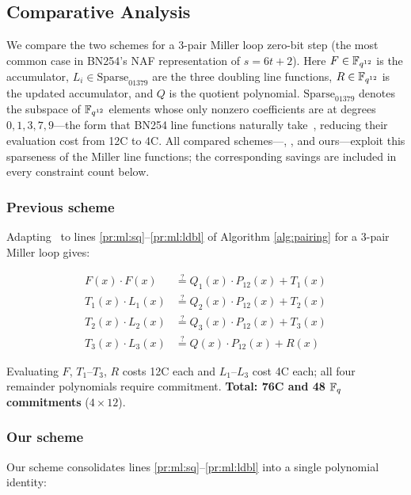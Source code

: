 \subsection{Comparative Analysis~\label{sec:ops:comp-analysis}}

We compare the two schemes for a 3-pair Miller loop zero-bit step (the most common case in BN254's NAF\cite{naf} representation of $s = 6t+2$). Here $F \in \mathbb{F}_{q^{12}}$ is the accumulator, $L_i \in \text{Sparse}_{01379}$ are the three doubling line functions, $R \in \mathbb{F}_{q^{12}}$ is the updated accumulator, and $Q$ is the quotient polynomial. $\text{Sparse}_{01379}$ denotes the subspace of $\mathbb{F}_{q^{12}}$ elements whose only nonzero coefficients are at degrees $0,1,3,7,9$---the form that BN254 line functions naturally take~\cite{PR1CS22}, reducing their evaluation cost from 12C to 4C. All compared schemes---\cite{PR1CS22}, \cite{FXFM23}, and ours---exploit this sparseness of the Miller line functions; the corresponding savings are included in every constraint count below.

\subsubsection{Previous scheme}

Adapting~\cite{FXFM23} to lines \ref{pr:ml:sq}--\ref{pr:ml:ldbl} of Algorithm \ref{alg:pairing} for a 3-pair Miller loop gives:

\begin{align*}
    F(x) \cdot F(x) &\stackrel{?}{=} Q_1(x) \cdot P_{12}(x) + T_1(x) \\
    T_1(x) \cdot L_1(x) &\stackrel{?}{=} Q_2(x) \cdot P_{12}(x) + T_2(x) \\
    T_2(x) \cdot L_2(x) &\stackrel{?}{=} Q_3(x) \cdot P_{12}(x) + T_3(x) \\
    T_3(x) \cdot L_3(x) &\stackrel{?}{=} Q(x) \cdot P_{12}(x) + R(x)
\end{align*}

Evaluating $F$, $T_1$–$T_3$, $R$ costs 12C each and $L_1$–$L_3$ cost 4C each; all four remainder polynomials require commitment. \textbf{Total: 76C and 48 $\mathbb{F}_q$ commitments} ($4 \times 12$).

\subsubsection{Our scheme}\label{sec:op:comp:our}

Our scheme consolidates lines \ref{pr:ml:sq}--\ref{pr:ml:ldbl} into a single polynomial identity:

